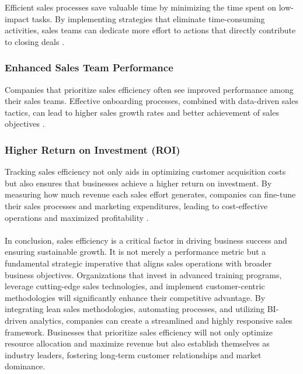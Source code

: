 Efficient sales processes save valuable time by minimizing the time spent on low-impact tasks. By implementing strategies that eliminate time-consuming activities, sales teams can dedicate more effort to actions that directly contribute to closing deals \cite{improved_time_management}.

\subsubsection{Enhanced Sales Team Performance}

Companies that prioritize sales efficiency often see improved performance among their sales teams. Effective onboarding processes, combined with data-driven sales tactics, can lead to higher sales growth rates and better achievement of sales objectives \cite{sales_team_performance}.

\subsubsection{Higher Return on Investment (ROI)}

Tracking sales efficiency not only aids in optimizing customer acquisition costs but also ensures that businesses achieve a higher return on investment. By measuring how much revenue each sales effort generates, companies can fine-tune their sales processes and marketing expenditures, leading to cost-effective operations and maximized profitability \cite{higher_roi}.


\paragraph{}
In conclusion, sales efficiency is a critical factor in driving business success and ensuring sustainable growth. It is not merely a performance metric but a fundamental strategic imperative that aligns sales operations with broader business objectives. Organizations that invest in advanced training programs, leverage cutting-edge sales technologies, and implement customer-centric methodologies will significantly enhance their competitive advantage. By integrating lean sales methodologies, automating processes, and utilizing BI-driven analytics, companies can create a streamlined and highly responsive sales framework. Businesses that prioritize sales efficiency will not only optimize resource allocation and maximize revenue but also establish themselves as industry leaders, fostering long-term customer relationships and market dominance.





